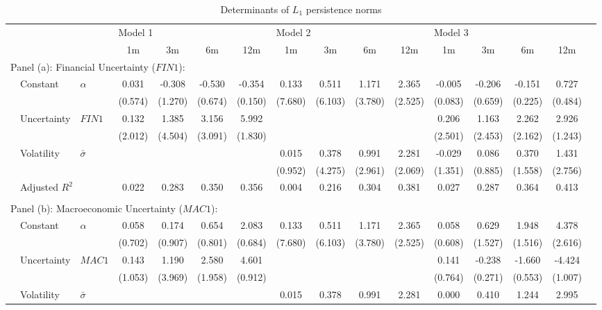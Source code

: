 \documentclass{article}
\begin{document}
\begin{sidewaystable}
    \begin{center}
        \caption{Determinants of $L_1$ persistence norms}
        \label{tab:reg41}
        \begin{tabular}{ll l c c c c c c c c c c c c c}
        \hline
              &&& \multicolumn{4}{l}{Model 1} & \multicolumn{4}{l}{Model 2}& \multicolumn{4}{l}{Model 3}\\
             &&& 1m & 3m & 6m & 12m & 1m & 3m & 6m & 12m & 1m & 3m & 6m & 12m\\
             \hline
             \multicolumn{12}{l}{Panel (a): Financial Uncertainty ($FIN1$): }\\
             & Constant & $\alpha$ & 0.031&-0.308&-0.530&-0.354&0.133&0.511&1.171&2.365&-0.005&-0.206&-0.151&0.727\\
              &&&(0.574)&(1.270)&(0.674)&(0.150)&(7.680)&(6.103)&(3.780)&(2.525)&(0.083)&(0.659)&(0.225)&(0.484)\\
             & Uncertainty & $FIN1$ & 0.132&1.385&3.156&5.992&&&&&0.206&1.163&2.262&2.926\\
             &&&(2.012)&(4.504)&(3.091)&(1.830)&&&&&(2.501)&(2.453)&(2.162)&(1.243)\\
             & Volatility & $\bar{\sigma}$&&&&&0.015&0.378&0.991&2.281&-0.029&0.086&0.370&1.431\\
             &&&&&&&(0.952)&(4.275)&(2.961)&(2.069)&(1.351)&(0.885)&(1.558)&(2.756)\\
             & \multicolumn{2}{l}{Adjusted $R^2$}&0.022&0.283&0.350&0.356&0.004&0.216&0.304&0.381&0.027&0.287&0.364&0.413\\
             &&&&&&&\\
             \multicolumn{9}{l}{Panel (b): Macroeconomic Uncertainty ($MAC1$): }\\
             & Constant & $\alpha$ & 0.058&0.174&0.654&2.083&0.133&0.511&1.171&2.365&0.058&0.629&1.948&4.378\\
            &&&(0.702)&(0.907)&(0.801)&(0.684)&(7.680)&(6.103)&(3.780)&(2.525)&(0.608)&(1.527)&(1.516)&(2.616)\\
            & Uncertainty & $MAC1$ & 0.143&1.190&2.580&4.601&&&&&0.141&-0.238&-1.660&-4.424\\
            &&&(1.053)&(3.969)&(1.958)&(0.912)&&&&&(0.764)&(0.271)&(0.553)&(1.007)\\
            & Volatility & $\bar{\sigma}$&&&&&0.015&0.378&0.991&2.281&0.000&0.410&1.244&2.995\\

\end{tabular}
\end{center}
\end{sidewaystable}
\end{document}
